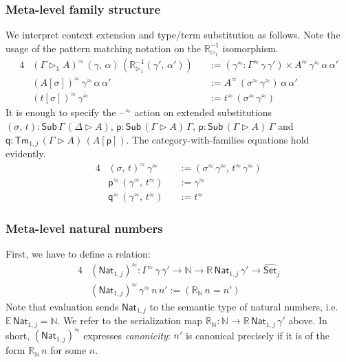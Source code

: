 \documentclass[acmsmall,review]{acmart}
\newcommand{\msf}[1]{\mathsf{#1}}
\newcommand{\mbb}[1]{\mathbb{#1}}
\newcommand{\wh}[1]{\widehat{#1}}
\newcommand{\ext}{\triangleright}
\newcommand{\Sub}{\msf{Sub}}
\newcommand{\Tm}{\msf{Tm}}
\newcommand{\p}{\mathsf{p}}
\newcommand{\q}{\mathsf{q}}
\newcommand{\Nat}{\msf{Nat}}
\newcommand{\Set}{\mathsf{Set}}
\newcommand{\blank}{{\mathord{\hspace{1pt}\text{--}\hspace{1pt}}}}
\newcommand{\ev}{\mbb{E}}
\newcommand{\re}{\mbb{R}}
\theoremstyle{remark}
\newcommand{\whset}{\wh{\Set}}
\newcommand{\rexti}{\re_{\ext_1}^{-1}}
\newcommand{\rel}{^{\approx}}
\begin{document}
\subsubsection{Meta-level family structure}
We interpret context extension and type/term substitution as follows. Note the
usage of the pattern matching notation on the $\rexti$ isomorphism.
\begin{alignat*}{4}
  & (\Gamma \ext_1 A)\rel\,(\gamma,\,\alpha)\,(\rexti(\gamma',\,\alpha')) && :=
    (\gamma\rel : \Gamma\rel\,\gamma\,\gamma') \times A\rel\,\gamma\rel\,\alpha\,\alpha'\\
  & (A[\sigma])\rel\,\gamma\rel\,\alpha\,\alpha' && := A\rel\,(\sigma\rel\,\gamma\rel)\,\alpha\,\alpha'\\
  & (t[\sigma])\rel\,\gamma\rel\                 && := t\rel\,(\sigma\rel\,\gamma\rel)
\end{alignat*}
It is enough to specify the $\blank\rel$ action on extended substitutions
$(\sigma,\,t) : \Sub\,\Gamma\,(\Delta\ext A)$, $\p : \Sub\,(\Gamma\ext
A)\,\Gamma$, $\p : \Sub\,(\Gamma\ext A)\,\Gamma$ and $\q : \Tm_{1,j}\,(\Gamma
\ext A)\,(A[\p])$. The category-with-families equations hold evidently.
\begin{alignat*}{4}
  & (\sigma,\,t)\rel\,\gamma\rel                 && := (\sigma\rel\,\gamma\rel,\,t\rel\,\gamma\rel)\\
  & \p\rel\,(\gamma\rel,\,t\rel)                 && := \gamma\rel\\
  & \q\rel\,(\gamma\rel,\,t\rel)                 && := t\rel
\end{alignat*}

\subsubsection{Meta-level natural numbers} First, we have to define a relation:
\begin{alignat*}{4}
  & (\Nat_{1,j})\rel : \Gamma\rel\,\gamma\,\gamma' \to \mbb{N} \to \re\,\Nat_{1,j}\,\gamma' \to \whset_j\\
  & (\Nat_{1,j})\rel\,\gamma\rel\,n\,n' := (\re_{\mbb{N}}\,n = n')
\end{alignat*}
Note that evaluation sends $\Nat_{1,j}$ to the semantic type of natural numbers,
i.e.\ $\ev\,\Nat_{1,j} = \mbb{N}$. We refer to the serialization map
$\re_{\mbb{N}} : \mbb{N} \to \re\,\Nat_{1,j}\,\gamma'$ above. In short,
$(\Nat_{1,j})\rel$ expresses \emph{canonicity}: $n'$ is canonical precisely if
it is of the form $\re_{\mbb{N}}\,n$ for some $n$.
\end{document}
